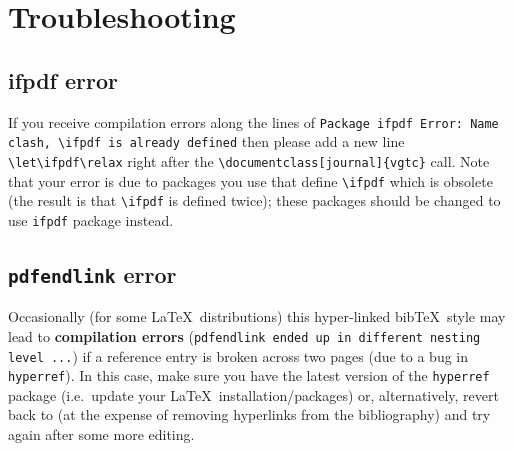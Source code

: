\documentclass[journal]{vgtc}                %
\begin{document}
\section{Troubleshooting}

\subsection{ifpdf error}

If you receive compilation errors along the lines of \texttt{Package ifpdf Error: Name clash, \textbackslash ifpdf is already defined} then please add a new line \verb|\let\ifpdf\relax| right after the \verb|\documentclass[journal]{vgtc}| call.
Note that your error is due to packages you use that define \verb|\ifpdf| which is obsolete (the result is that \verb|\ifpdf| is defined twice); these packages should be changed to use \verb|ifpdf| package instead.


\subsection{\texttt{pdfendlink} error}

Occasionally (for some \LaTeX\ distributions) this hyper-linked bib\TeX\ style may lead to \textbf{compilation errors} (\texttt{pdfendlink ended up in different nesting level ...}) if a reference entry is broken across two pages (due to a bug in \verb|hyperref|).
In this case, make sure you have the latest version of the \verb|hyperref| package (i.e.\ update your \LaTeX\ installation/packages) or, alternatively, revert back to \verb|| (at the expense of removing hyperlinks from the bibliography) and try \verb|| again after some more editing.
\end{document}

